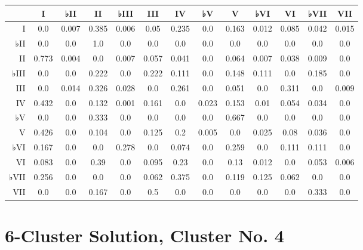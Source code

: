 \begin{table}[htbp]
\begin{minipage}{\linewidth}
\setlength{\tymax}{0.5\linewidth}
\centering
\small
\begin{tabulary}{\textwidth}{@{}RCCCCCCCCCCCC@{}} \toprule
&I&♭II&II&♭III&III&IV&♭V&V&♭VI&VI&♭VII&VII\\
\midrule
I&0.0&0.007&0.385&0.006&0.05&0.235&0.0&0.163&0.012&0.085&0.042&0.015\\
♭II&0.0&0.0&1.0&0.0&0.0&0.0&0.0&0.0&0.0&0.0&0.0&0.0\\
II&0.773&0.004&0.0&0.007&0.057&0.041&0.0&0.064&0.007&0.038&0.009&0.0\\
♭III&0.0&0.0&0.222&0.0&0.222&0.111&0.0&0.148&0.111&0.0&0.185&0.0\\
III&0.0&0.014&0.326&0.028&0.0&0.261&0.0&0.051&0.0&0.311&0.0&0.009\\
IV&0.432&0.0&0.132&0.001&0.161&0.0&0.023&0.153&0.01&0.054&0.034&0.0\\
♭V&0.0&0.0&0.333&0.0&0.0&0.0&0.0&0.667&0.0&0.0&0.0&0.0\\
V&0.426&0.0&0.104&0.0&0.125&0.2&0.005&0.0&0.025&0.08&0.036&0.0\\
♭VI&0.167&0.0&0.0&0.278&0.0&0.074&0.0&0.259&0.0&0.111&0.111&0.0\\
VI&0.083&0.0&0.39&0.0&0.095&0.23&0.0&0.13&0.012&0.0&0.053&0.006\\
♭VII&0.256&0.0&0.0&0.0&0.062&0.375&0.0&0.119&0.125&0.062&0.0&0.0\\
VII&0.0&0.0&0.167&0.0&0.5&0.0&0.0&0.0&0.0&0.0&0.333&0.0\\

\bottomrule

\end{tabulary}
\end{minipage}
\end{table}

\section{6-Cluster Solution, Cluster No. 4}
\label{6-clustersolutionclusterno.4}

